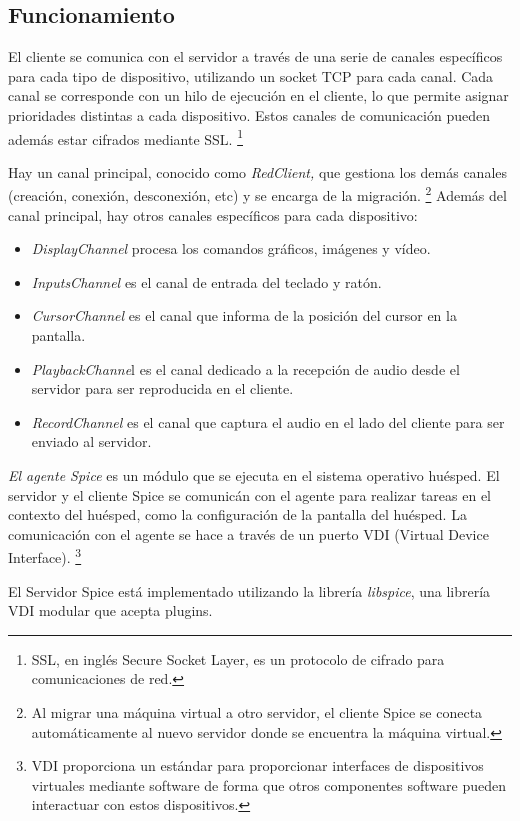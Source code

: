 \documentclass[spanisheDIVcalc,twoside,parskip-,pointlessnumbers,final]{scrbook}
\begin{document}
\subsection{Funcionamiento}

El cliente se comunica con el servidor a través de una serie de canales
específicos para cada tipo de dispositivo, utilizando un socket TCP
para cada canal. Cada canal se corresponde con un hilo de ejecución
en el cliente, lo que permite asignar prioridades distintas a cada
dispositivo. Estos canales de comunicación pueden además estar cifrados
mediante SSL.%
\footnote{SSL, en inglés Secure Socket Layer, es un protocolo de cifrado para
comunicaciones de red.%
}

Hay un canal principal, conocido como \emph{RedClient, }que gestiona
los demás canales (creación, conexión, desconexión, etc) y se encarga
de la migración.%
\footnote{Al migrar una máquina virtual a otro servidor, el cliente Spice se
conecta automáticamente al nuevo servidor donde se encuentra la máquina
virtual.%
} Además del canal principal, hay otros canales específicos para cada
dispositivo:
\begin{itemize}
\item \emph{DisplayChannel} procesa los comandos gráficos, imágenes y vídeo.
\item \emph{InputsChannel} es el canal de entrada del teclado y ratón.
\item \emph{CursorChannel} es el canal que informa de la posición del cursor
en la pantalla.
\item \emph{PlaybackChanne}l es el canal dedicado a la recepción de audio
desde el servidor para ser reproducida en el cliente.
\item \emph{RecordChannel} es el canal que captura el audio en el lado del
cliente para ser enviado al servidor.
\end{itemize}
\emph{El agente Spice} es un módulo que se ejecuta en el sistema operativo
huésped. El servidor y el cliente Spice se comunicán con el agente
para realizar tareas en el contexto del huésped, como la configuración
de la pantalla del huésped. La comunicación con el agente se hace
a través de un puerto VDI (Virtual Device Interface).%
\footnote{VDI proporciona un estándar para proporcionar interfaces de dispositivos
virtuales mediante software de forma que otros componentes software
pueden interactuar con estos dispositivos.%
}

El Servidor Spice está implementado utilizando la librería \emph{libspice},
una librería VDI modular que acepta plugins.
\end{document}

